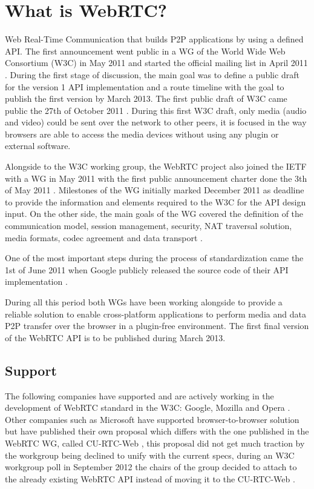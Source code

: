 \section{What is WebRTC?}

\thispagestyle{empty}

Web Real-Time Communication that builds P2P applications by using a defined API. The first announcement went public in a WG of the World Wide Web Consortium (W3C) in May 2011 \cite{webrtcW3cgroup} and started the official mailing list in April 2011 \cite{welcomeW3C}. During the first stage of discussion, the main goal was to define a public draft for the version 1 API implementation and a route timeline with the goal to publish the first version by March 2013. The first public draft of W3C came public the 27th of October 2011 \cite{originalW3Cdraft}. During this first W3C draft, only media (audio and video) could be sent over the network to other peers, it is focused in the way browsers are able to access the media devices without using any plugin or external software.

Alongside to the W3C working group, the WebRTC project also joined the IETF with a WG in May 2011 \cite{webrtcIETFgroup} with the first public announcement charter done the 3th of May 2011 \cite{webrtcIETFcharter}. Milestones of the WG initially marked December 2011 as deadline to provide the information and elements required to the W3C for the API design input. On the other side, the main goals of the WG covered the definition of the communication model, session management, security, NAT traversal solution, media formats, codec agreement and data transport \cite{webrtcIETFcharter}.

One  of the most important steps during the process of standardization came the 1st of June 2011 when Google publicly released the source code of their API implementation \cite{haraldpublicWebRTC}. 

During all this period both WGs have been working alongside to provide a reliable solution to enable cross-platform applications to perform media and data P2P transfer over the browser in a plugin-free environment. The first final version of the WebRTC API is to be published during March 2013.

\subsection{Support}

The following companies have supported and are actively working in the development of WebRTC standard in the W3C: Google, Mozilla and Opera \cite{googleAnnouncement}. Other companies such as Microsoft have supported browser-to-browser solution but have published their own proposal which differs with the one published in the WebRTC WG, called CU-RTC-Web \cite{curtcweb}, this proposal did not get much traction by the workgroup being declined to unify with the current specs, during an W3C workgroup poll in September 2012 the chairs of the group decided to attach to the already existing WebRTC API instead of moving it to the CU-RTC-Web \cite{curtcpoll}.

